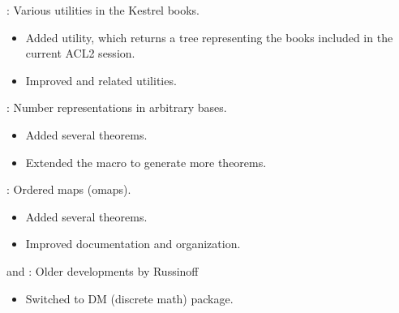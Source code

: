 
\begin{frame}

\implibtitle

:
Various utilities in the Kestrel books.
\begin{itemize}
\item Added  utility,
      which returns a tree representing
      the books included in the current ACL2 session.
\item Improved  and related utilities.
\end{itemize}

\end{frame}


\begin{frame}

\implibtitle

:
Number representations in arbitrary bases.
\begin{itemize}
\item Added several theorems.
\item Extended the  macro to generate more theorems.
\end{itemize}

\end{frame}


\begin{frame}

\implibtitle

:
Ordered maps (omaps).
\begin{itemize}
\item Added several theorems.
\item Improved documentation and organization.
\end{itemize}

\end{frame}


\begin{frame}

\implibtitle

 and :
Older developments by Russinoff
\begin{itemize}
\item Switched to DM (discrete math) package.
\end{itemize}

\end{frame}

